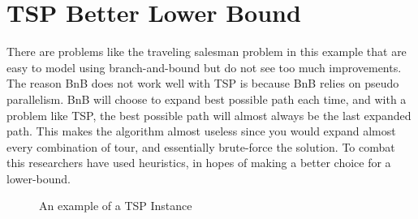 
\section{TSP Better Lower Bound}
    There are problems like the traveling salesman problem in this example
    that are easy to model using branch-and-bound but do not see too much improvements.
    The reason BnB does not work well with TSP is because BnB relies on pseudo
    parallelism. BnB will choose to expand best possible path each time, and 
    with a problem like TSP, the best possible path will almost always be the 
    last expanded path. This makes the algorithm almost useless since you 
    would expand almost every combination of tour, and essentially brute-force the solution.
    To combat this researchers have used heuristics, in hopes of making a better
    choice for a lower-bound.


    \begin{figure}[h]
        \begin{center}
        \end{center}
        \caption{\doublespacing An example of a TSP Instance}
    \end{figure}
